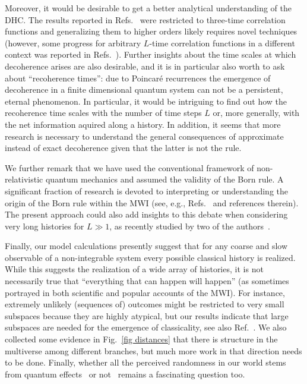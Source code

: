 \documentclass[pre,onecolumn,12pt,aps,longbibliography,nofootinbib]{revtex4-2}
\newcommand{\blue}[1]{#1}
\newcommand{\new}[1]{#1}
\begin{document}
\blue{Moreover,} it would be desirable to get a better analytical understanding of the DHC. The results reported in Refs.~\cite{StrasbergEtAlPRA2023, StrasbergSP2023} were restricted to three-time correlation functions and generalizing them to higher orders likely requires novel techniques (however, some progress for arbitrary $L$-time correlation functions in a different context was reported in Refs.~\cite{FigueroaRomeroModiPollockQuantum2019, FigueroaRomeroPollockModiCP2021, DowlingEtAlQuantum2023, DowlingEtAlSPC2023}). Further insights about the time scales at which \new{decoherence} arises are also desirable, and it is in particular also worth to ask about ``recoherence times'': due to Poincar\'e recurrences the emergence of \new{decoherence} in a finite dimensional quantum system can not be a persistent, eternal phenomenon. In particular, it would be intriguing to find out how the recoherence time scales with the number of time steps $L$ or, more generally, with the {net} information aquired along a history. \blue{In addition, it seems that more research is necessary to understand the general consequences of approximate instead of exact decoherence given that the latter is not the rule.}

We further remark that we have used the conventional framework of non-relativistic quantum mechanics and assumed the validity of the Born rule. A significant fraction of research is devoted to interpreting or understanding the origin of the Born rule within the MWI (see, e.g., Refs.~\cite{VaidmanISPS1998, SaundersEtAlBook2010, AguirreTegmarkPRD2011, WallaceBook2012, Vaidman2020, ZurekEnt2022} \new{and references therein). The present approach could also add insights to this debate when considering very long histories for $L\gg1$, as recently studied by two of the authors~\cite{StrasbergSchindlerArXiv2023}.}

Finally, our model calculations presently suggest that for any coarse and slow observable of a non-integrable system every possible classical history is realized. While this suggests the realization of a wide array of histories, it is {not} necessarily true that ``everything that can happen will happen'' (as sometimes portrayed in both scientific and popular accounts of the MWI). For instance, extremely unlikely (sequences of) outcomes might be restricted to very small subspaces because they are highly atypical, but our results indicate that large subspaces are needed for the emergence of classicality\new{, see also Ref.~\cite{StrasbergSchindlerArXiv2023}}. \blue{We also collected some evidence in Fig.~\ref{fig distances} that there is structure in the multiverse among different branches, but much more work in that direction needs to be done.} Finally, whether all the perceived randomness in our world stems from quantum effects~\cite{AlbrechtPhillipsPRD2014} \new{or not}~\cite{DelSantoGisinPRA2019} \new{remains a fascinating question too}.
\end{document}
